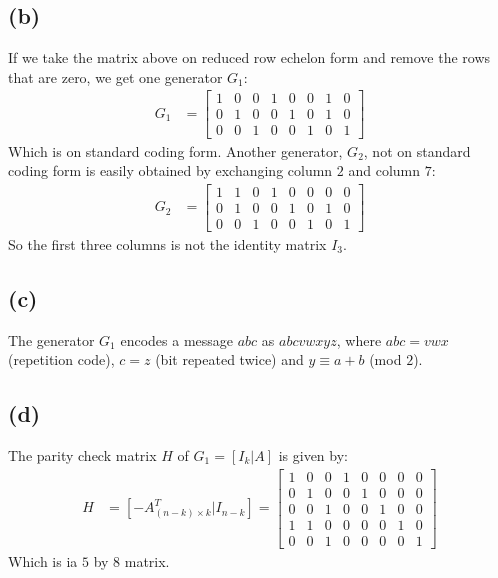 \documentclass[a4paper, fleqn]{article}
\begin{document}
\subsection*{(b)}
If we take the matrix above on reduced row echelon form and remove the rows that are
zero, we get one generator $G_1$:
\begin{align*}
  G_1 &=
    \begin{bmatrix}
    1 & 0 & 0 & 1 & 0 & 0 & 1 & 0 \\
    0 & 1 & 0 & 0 & 1 & 0 & 1 & 0 \\
    0 & 0 & 1 & 0 & 0 & 1 & 0 & 1
  \end{bmatrix}
\end{align*}
Which is on standard coding form. Another generator, $G_2$, not on standard coding form
is easily obtained by exchanging column $2$ and column $7$:
\begin{align*}
  G_2 &=
    \begin{bmatrix}
    1 & 1 & 0 & 1 & 0 & 0 & 0 & 0 \\
    0 & 1 & 0 & 0 & 1 & 0 & 1 & 0 \\
    0 & 0 & 1 & 0 & 0 & 1 & 0 & 1
  \end{bmatrix}
\end{align*}
So the first three columns is not the identity matrix $I_3$.

\subsection*{(c)}
The generator $G_1$ encodes a message $abc$ as $abcvwxyz$, where $abc=vwx$ (repetition
code), $c=z$ (bit repeated twice) and $y\equiv a+b$ (mod $2$).

\subsection*{(d)}
The parity check matrix $H$ of $G_1=[I_k|A]$ is given by:
\begin{align*}
  H&=[-A_{(n-k)\times k}^T|I_{n-k}]=
  \begin{bmatrix}
    1 & 0 & 0 & 1 & 0 & 0 & 0 & 0 \\
    0 & 1 & 0 & 0 & 1 & 0 & 0 & 0 \\
    0 & 0 & 1 & 0 & 0 & 1 & 0 & 0 \\
    1 & 1 & 0 & 0 & 0 & 0 & 1 & 0 \\
    0 & 0 & 1 & 0 & 0 & 0 & 0 & 1
  \end{bmatrix}
\end{align*}
Which is ia $5$ by $8$ matrix.
\end{document}
